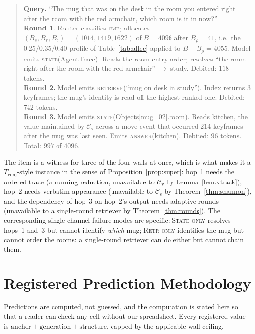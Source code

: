 \documentclass[10pt]{article}
\theoremstyle{definition}
\theoremstyle{plain}
\newcommand{\cs}{\mathcal{C}_{\mathrm{s}}}
\newcommand{\cv}{\mathcal{C}_{\mathrm{v}}}
\begin{document}
\begin{quote}\small
\textbf{Query.} ``The mug that was on the desk in the room you entered right after the room with the red armchair, which room is it in now?''\\[2pt]
\textbf{Round 1.} Router classifies \textsc{cmp}; allocates $(B_s,B_r,B_c)=(1014,1419,1622)$ of $B{=}4096$ after $B_\rho{=}41$, i.e.\ the $0.25/0.35/0.40$ profile of Table~\ref{tab:alloc} applied to $B-B_\rho=4055$. Model emits \textsc{state}(\textrm{AgentTrace}). Reads the room-entry order; resolves ``the room right after the room with the red armchair'' $\to$ \textrm{study}. Debited: $118$ tokens.\\[2pt]
\textbf{Round 2.} Model emits \textsc{retrieve}(``mug on desk in study''). Index returns $3$ keyframes; the mug's identity is read off the highest-ranked one. Debited: $742$ tokens.\\[2pt]
\textbf{Round 3.} Model emits \textsc{state}(\textrm{Objects[mug\_02].room}). Reads \textrm{kitchen}, the value maintained by $\cs$ across a move event that occurred $214$ keyframes after the mug was last seen. Emits \textsc{answer}(\textrm{kitchen}). Debited: $96$ tokens. Total: $997$ of $4096$.
\end{quote}

\noindent The item is a witness for three of the four walls at once, which is what makes it a $T_{\mathrm{conj}}$-style instance in the sense of Proposition~\ref{prop:super}: hop~1 needs the ordered trace (a running reduction, unavailable to $\cv$ by Lemma~\ref{lem:vtrack}), hop~2 needs verbatim appearance (unavailable to $\cs$ by Theorem~\ref{thm:shannon}), and the dependency of hop~3 on hop~2's output needs adaptive rounds (unavailable to a single-round retriever by Theorem~\ref{thm:rounds}). The corresponding single-channel failure modes are specific: \textsc{State-only} resolves hops~1 and~3 but cannot identify \emph{which} mug; \textsc{Retr-only} identifies the mug but cannot order the rooms; a single-round retriever can do either but cannot chain them.

\section{Registered Prediction Methodology}
\label{app:predictions}

Predictions are computed, not guessed, and the computation is stated here so that a reader can check any cell without our spreadsheet. Every registered value is $\mathrm{anchor}+\mathrm{generation}+\mathrm{structure}$, capped by the applicable wall ceiling.
\end{document}
